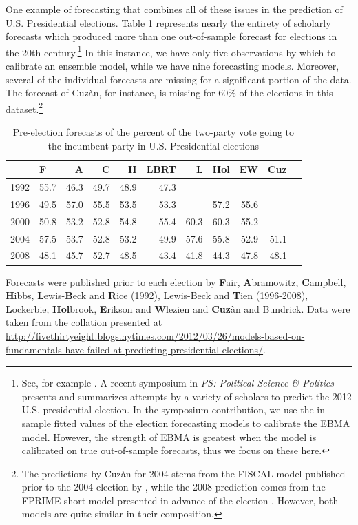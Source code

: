 \documentclass[12pt,fullpage,endnotes]{article}
\begin{document}
One example of forecasting that combines all of these issues in the
prediction of U.S. Presidential elections.  Table 1 represents nearly
the entirety of scholarly forecasts which produced more than one
out-of-sample forecast for elections in the 20th century.\footnote{
  See, for example \citet[][]{Fair:2009, Fair2011, Abramowitz:2008,
    Campbell:2008, Cuzan:2004,Cuzan:Bundrick:2008,hibbs:2012, Lockerbie:2008, Erikson:Wlezien:2008,
    Graefe:2010, Holbrook:2008}.  A recent symposium in {\em PS:
    Political Science \& Politics} presents and summarizes attempts by
  a variety of scholars to predict the 2012 U.S. presidential
  election. In the symposium contribution, we use the in-sample fitted
  values of the election forecasting models to calibrate the EBMA
  model. However, the strength of EBMA is greatest when the model is
  calibrated on true out-of-sample forecasts, thus we focus on these
  here.}  In this instance, we have only five observations by which
to calibrate an ensemble model, while we have nine forecasting models.
Moreover, several of the individual forecasts are missing for a
significant portion of the data.  The forecast of Cuz\`an, for
instance, is missing for 60\% of the elections in this
dataset.\footnote{The predictions by Cuz\`an for 2004 stems from the
  FISCAL model published prior to the 2004 election by
  \citet{Cuzan:2004}, while the 2008 prediction comes from the FPRIME
  short model presented in advance of the election
  \citep{Cuzan:Bundrick:2008}. However, both models are quite similar
  in their composition.}

\begin{table}[ht]
\caption{Pre-election forecasts of the percent of the two-party vote going to the incumbent party in U.S. Presidential elections}
\label{tab:one}
\footnotesize
\begin{center}
\begin{tabular}{rlrrrrrrrrr}
  \toprule
  & F & A & C & H & LBRT & L & Hol & EW & Cuz \\ 
  \midrule
  1992 & 55.7 & 46.3 & 49.7 & 48.9 & 47.3 &  &  &  &  \\ 
  1996 & 49.5 & 57.0 & 55.5 & 53.5 & 53.3 &  & 57.2 & 55.6 &  \\ 
  2000 & 50.8 & 53.2 & 52.8 & 54.8 & 55.4 & 60.3 & 60.3 & 55.2 &  \\ 
  2004 & 57.5 & 53.7 & 52.8 & 53.2 & 49.9 & 57.6 & 55.8 & 52.9 & 51.1 \\ 
  2008 & 48.1 & 45.7 & 52.7 & 48.5 & 43.4 & 41.8 & 44.3 & 47.8 & 48.1 \\ 
  \bottomrule

\end{tabular}
\end{center}
Forecasts were published prior to each election by \textbf{F}air, \textbf{A}bramowitz, \textbf{C}ampbell, \textbf{H}ibbs, \textbf{L}ewis-\textbf{B}eck and \textbf{R}ice (1992), Lewis-Beck and \textbf{T}ien  (1996-2008),   \textbf{L}ockerbie, \textbf{Hol}brook, \textbf{E}rikson and \textbf{W}lezien and \textbf{Cuz}\`an and Bundrick.  Data were taken from the collation presented at \url{http://fivethirtyeight.blogs.nytimes.com/2012/03/26/models-based-on-fundamentals-have-failed-at-predicting-presidential-elections/}.
\end{table}
\end{document}
